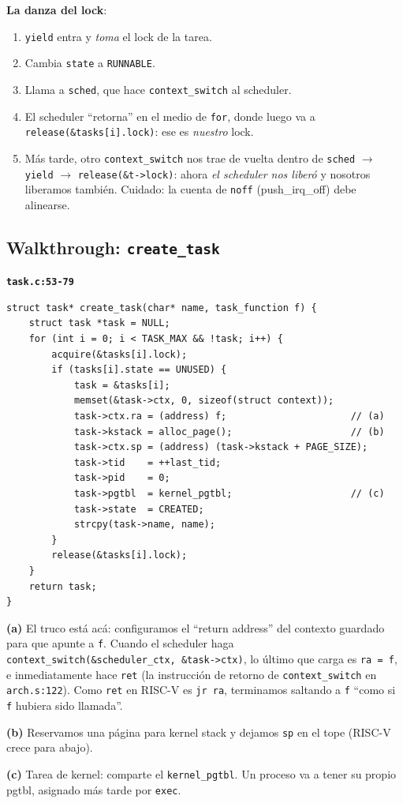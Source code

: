 \documentclass[11pt,a4paper]{article}
\begin{document}
\textbf{La danza del lock}:

\begin{enumerate}[nosep,leftmargin=*]
    \item \texttt{yield} entra y \emph{toma} el lock de la tarea.
    \item Cambia \texttt{state} a \texttt{RUNNABLE}.
    \item Llama a \texttt{sched}, que hace \texttt{context\_switch}
        al scheduler.
    \item El scheduler ``retorna'' en el medio de \texttt{for},
        donde luego va a \texttt{release(\&tasks[i].lock)}: ese es
        \emph{nuestro} lock.
    \item Más tarde, otro \texttt{context\_switch} nos trae de
        vuelta dentro de \texttt{sched} $\to$ \texttt{yield} $\to$
        \texttt{release(\&t->lock)}: ahora \emph{el scheduler nos
        liberó} y nosotros liberamos también. Cuidado: la cuenta
        de \texttt{noff} (push\_irq\_off) debe alinearse.
\end{enumerate}

\subsection*{Walkthrough: \texttt{create\_task}}

\begin{walkthrough}
\textbf{\texttt{task.c:53-79}}

\begin{lstlisting}[style=cstyle]
struct task* create_task(char* name, task_function f) {
    struct task *task = NULL;
    for (int i = 0; i < TASK_MAX && !task; i++) {
        acquire(&tasks[i].lock);
        if (tasks[i].state == UNUSED) {
            task = &tasks[i];
            memset(&task->ctx, 0, sizeof(struct context));
            task->ctx.ra = (address) f;                      // (a)
            task->kstack = alloc_page();                     // (b)
            task->ctx.sp = (address) (task->kstack + PAGE_SIZE);
            task->tid    = ++last_tid;
            task->pid    = 0;
            task->pgtbl  = kernel_pgtbl;                     // (c)
            task->state  = CREATED;
            strcpy(task->name, name);
        }
        release(&tasks[i].lock);
    }
    return task;
}
\end{lstlisting}

\textbf{(a)} El truco está acá: configuramos el ``return address''
del contexto guardado para que apunte a \texttt{f}. Cuando el
scheduler haga \texttt{context\_switch(\&scheduler\_ctx,
\&task->ctx)}, lo último que carga es \texttt{ra = f}, e
inmediatamente hace \texttt{ret} (la instrucción de retorno de
\texttt{context\_switch} en \texttt{arch.s:122}). Como \texttt{ret}
en RISC-V es \texttt{jr ra}, terminamos saltando a \texttt{f} ``como
si \texttt{f} hubiera sido llamada''.

\textbf{(b)} Reservamos una página para kernel stack y dejamos
\texttt{sp} en el tope (RISC-V crece para abajo).

\textbf{(c)} Tarea de kernel: comparte el \texttt{kernel\_pgtbl}.
Un proceso va a tener su propio pgtbl, asignado más tarde por
\texttt{exec}.
\end{walkthrough}
\end{document}

